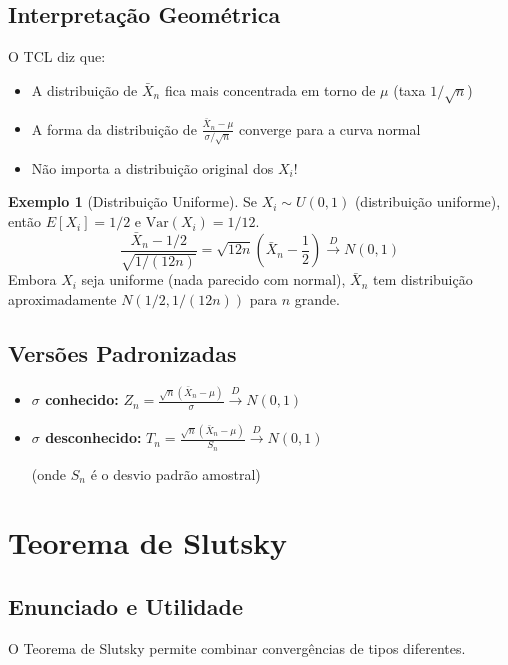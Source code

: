 \documentclass[12pt,a4paper]{article}
\theoremstyle{definition}
\newtheorem{exemplo}{Exemplo}[section]
\theoremstyle{plain}
\begin{document}
\subsection{Interpretação Geométrica}

O TCL diz que:
\begin{itemize}
    \item A distribuição de $\bar{X}_n$ fica mais concentrada em torno de $\mu$ (taxa $1/\sqrt{n}$)
    \item A forma da distribuição de $\frac{\bar{X}_n - \mu}{\sigma/\sqrt{n}}$ converge para a curva normal
    \item Não importa a distribuição original dos $X_i$!
\end{itemize}

\begin{exemplo}[Distribuição Uniforme]
Se $X_i \sim U(0,1)$ (distribuição uniforme), então $E[X_i] = 1/2$ e $\text{Var}(X_i) = 1/12$.
\[
\frac{\bar{X}_n - 1/2}{\sqrt{1/(12n)}} = \sqrt{12n}\left(\bar{X}_n - \frac{1}{2}\right) \xrightarrow{D} N(0,1)
\]
Embora $X_i$ seja uniforme (nada parecido com normal), $\bar{X}_n$ tem distribuição aproximadamente $N(1/2, 1/(12n))$ para $n$ grande.
\end{exemplo}

\subsection{Versões Padronizadas}

\begin{itemize}
    \item \textbf{$\sigma$ conhecido:} $Z_n = \frac{\sqrt{n}(\bar{X}_n - \mu)}{\sigma} \xrightarrow{D} N(0,1)$
    
    \item \textbf{$\sigma$ desconhecido:} $T_n = \frac{\sqrt{n}(\bar{X}_n - \mu)}{S_n} \xrightarrow{D} N(0,1)$
    
    (onde $S_n$ é o desvio padrão amostral)
\end{itemize}

\section{Teorema de Slutsky}

\subsection{Enunciado e Utilidade}

O Teorema de Slutsky permite combinar convergências de tipos diferentes.
\end{document}
